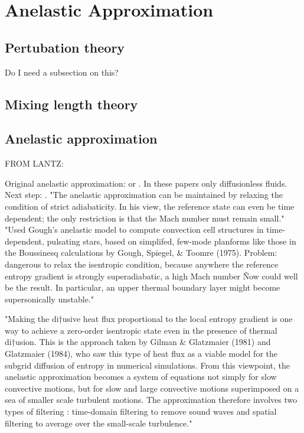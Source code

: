\documentclass{article}
\begin{document}
\section{Anelastic Approximation}
\subsection{Pertubation theory}
Do I need a subsection on this?
\subsection{Mixing length theory}
\subsection{Anelastic approximation}

FROM LANTZ:

Original anelastic approximation: \citep{1962JAtS...19..159C} or \citep{1962JAtS...19..173O}. In these papers only diffusionless fluids.\\

Next step: \citep{1969JAtS...26..448G}. "The anelastic approximation can be maintained by relaxing the condition of strict adiabaticity. In his view, the reference state can even be time dependent; the only restriction is that the Mach number must remain small."  "Used Gough's anelastic model to compute convection cell structures in time-dependent, pulsating stars, based on simplifed, few-mode planforms like those in the Boussinesq
calculations by Gough, Spiegel, \& Toomre (1975). Problem: dangerous to relax the isentropic condition, because anywhere the reference entropy gradient is strongly superadiabatic, a high Mach number Ñow could well be the result. In particular, an upper thermal boundary layer might become supersonically unstable."

"Making the di†usive heat flux proportional to the local entropy gradient is one way to achieve a zero-order isentropic state even in the presence of thermal di†usion. This is the approach taken by Gilman \& Glatzmaier (1981) and Glatzmaier (1984), who saw this type of heat flux as a viable model for the subgrid diffusion of entropy in numerical simulations. From this viewpoint, the anelastic approximation becomes a system of equations not simply for slow convective motions, but for slow and large convective motions superimposed on a sea of smaller scale turbulent motions. The approximation therefore involves two types of filtering : time-domain filtering to remove sound waves and spatial filtering to average over the small-scale turbulence."
\end{document}
